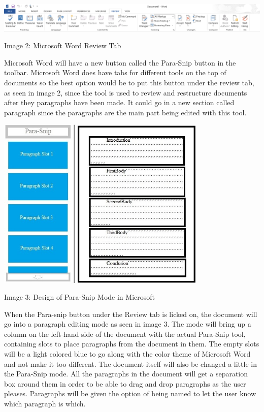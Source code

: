 \documentclass{article}
\begin{document}
{\begin{center}
\includegraphics[width=150mm]{MWReview.png}
\end{center}
\begin{center}
Image 2: Microsoft Word Review Tab
\end{center}
\medskip

	Microsoft Word will have a new button called the Para-Snip button in the toolbar. Microsoft Word does have tabs for different tools on the top of documents so the best option would be to put this button under the review tab, as seen in image 2, since the tool is used to review and restructure documents after they paragraphs have been made. It could go in a new section called paragraph since the paragraphs are the main part being edited with this tool.
\bigskip

\begin{center}
\includegraphics[width=100mm]{Essay2.jpg}
\end{center}
\begin{center}
Image 3: Design of Para-Snip Mode in Microsoft
\end{center}
\medskip

	When the Para-snip button under the Review tab is licked on, the document will go into a paragraph editing mode as seen in image 3. The mode will bring up a column on the left-hand side of the document with the actual Para-Snip tool, containing slots to place paragraphs from the document in them. The empty slots will be a light colored blue to go along with the color theme of Microsoft Word and not make it too different. The document itself will also be changed a little in the Para-Snip mode. All the paragraphs in the document will get a separation box around them in order to be able to drag and drop paragraphs as the user pleases. Paragraphs will be given the option of being named to let the user know which paragraph is which.
	
}
\end{document}
